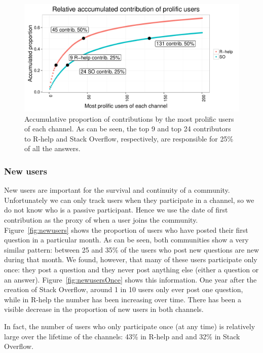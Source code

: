 \documentclass[smallextended]{svjour3}       %
\newcommand{\SO}{Stack Overflow\xspace}
\newcommand{\RH}{R-help\xspace}
\begin{document}
\begin{figure}[htbp]
  \centering
  \includegraphics[width=.95\textwidth]{figs/prolific.pdf}
  \caption{Accumulative proportion of contributions by the most prolific users of each channel. As can be seen, the
    top 9 and top 24
    contributors to \RH and \SO, respectively, are responsible for 25\% of all the answers.}
  \label{fig:prolific}
\end{figure}

\subsubsection{New users}

New users are important for the survival and continuity of a community. Unfortunately we can only track users when they
participate in a channel, so we do not know who is a passive participant. Hence we use the date of first
contribution as the proxy of when a user joins the community.  Figure~\ref{fig:newusers} shows the proportion of users
who have posted their first question in a particular month. As can be seen, both communities show a very similar
pattern: between 25 and 35\% of the users who post new questions are new during that month. We found, however, that many
of these users participate only once: they post a question and they never post anything else (either a question or an
answer). Figure~\ref{fig:newusersOnce} shows this information. One year after the creation of \SO, around 1 in 10 users
only ever post one question, while in \RH the number has been increasing over time. There has been a visible decrease in
the proportion of new users in both channels.

In fact, the number of users who only participate once (at any time) is relatively large over the lifetime of the channels: 43\% in
\RH and and 32\% in \SO.
\end{document}
